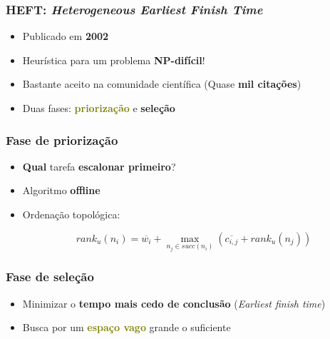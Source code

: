 \documentclass{beamer}
\newcommand{\colorize}[2]{\textbf{\textcolor{#1}{#2}}}
\begin{document}
\begin{frame}
\frametitle{HEFT: \emph{Heterogeneous Earliest Finish Time}}
\begin{itemize}
	\item Publicado em \colorize{n_green}{2002}
	\item Heurística para um problema \colorize{n_red}{NP-difícil}!
	\item Bastante aceito na comunidade científica (Quase \colorize{n_violet}{mil citações})
	\item Duas fases: \colorize{olive}{priorização} e \colorize{RawSienna}{seleção}
\end{itemize}

\end{frame}

\begin{frame}
\frametitle{Fase de priorização}
\begin{itemize}
	\item \colorize{n_red}{Qual} tarefa \colorize{n_red}{escalonar primeiro}?
	\item Algoritmo \colorize{n_green}{offline}
	\item Ordenação topológica:
	
	$$ rank_u(n_i) = \overline{w_i} + \max_{n_j \in succ(n_i)} (\overline{c_{i,j}} + rank_u(n_j)) $$
\end{itemize}
\end{frame}

\begin{frame}
\frametitle{Fase de seleção}
\begin{itemize}
	\item Minimizar o \colorize{n_red}{tempo mais cedo de conclusão} (\emph{Earliest finish time})
	\item Busca por um \colorize{olive}{espaço vago} grande o suficiente
\end{itemize}
\end{frame}
\end{document}
